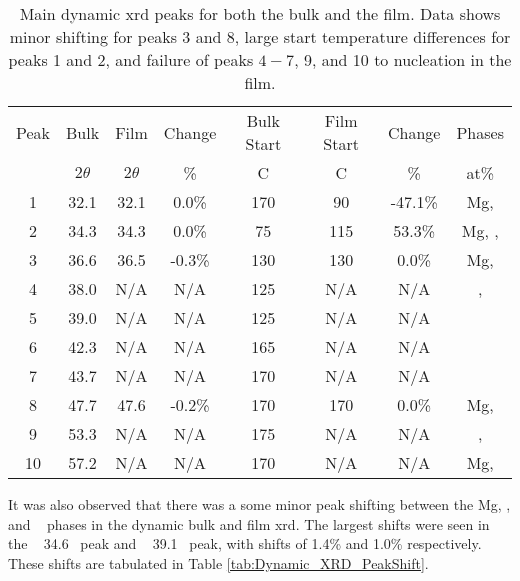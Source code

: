 \documentclass[a4paper,12pt,oneside]{article}%
\begin{document}
\begin{table}[h]
	\centering
	\caption{Main dynamic \acrshort{xrd} peaks for both the bulk and the film. Data shows minor shifting for peaks 3 and 8, large start temperature differences for peaks 1 and 2, and failure of peaks $4-7$, 9, and 10 to nucleation in the film.}
	\begin{tabular}{ c c c c c c c c }
		\toprule
		Peak & Bulk & Film & Change & Bulk Start & Film Start & Change & Phases \\
		& $2\theta$ & $2\theta$ & \% & \degree C & \degree C & \% & at\% \\
		\midrule
		1    & 32.1 & 32.1 & 0.0\%  & 170 & 90 & -47.1\% & Mg, \MgZn \\
		2    & 34.3 & 34.3 & 0.0\%  & 75  & 115 & 53.3\% & Mg, \MgZn, \CaMgZnFive \\
		3    & 36.6 & 36.5 & -0.3\% & 130 & 130 & 0.0\%  & Mg, \MgZn \\
		4    & 38.0 & N/A  & N/A    & 125 & N/A & N/A    & \MgZn, \CaMgZnFive \\
		5    & 39.0 & N/A  & N/A    & 125 & N/A & N/A    & \MgZn \\
		6    & 42.3 & N/A  & N/A    & 165 & N/A & N/A    & \CaMgZnFive \\
		7    & 43.7 & N/A  & N/A    & 170 & N/A & N/A    & \CaMgZnFive \\
		8    & 47.7 & 47.6 & -0.2\% & 170 & 170 & 0.0\%  & Mg, \MgZn \\
		9    & 53.3 & N/A  & N/A    & 175 & N/A & N/A    & \MgZn, \CaMgZnFive \\
		10   & 57.2 & N/A  & N/A    & 170 & N/A  & N/A   & Mg, \MgZn \\
		\bottomrule
	\end{tabular}
	\label{tab:Dynamic_XRD}
\end{table}

It was also observed that there was a some minor peak shifting between the Mg, \MgZn, and \CaMgZnFive~ phases in the dynamic bulk and film \acrshort{xrd}. The largest shifts were seen in the \CaMgZnFive~ 34.6\degree~ peak and \MgZn~ 39.1\degree~ peak, with shifts of 1.4\% and 1.0\% respectively. These shifts are tabulated in Table \ref{tab:Dynamic_XRD_PeakShift}.
\end{document}
